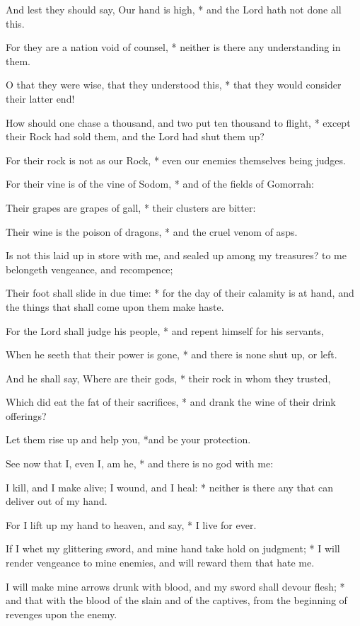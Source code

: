 \begin{multicols}{2}
And lest they should say, Our hand is high, * and the Lord hath not done all this.\par
For they are a nation void of counsel, * neither is there any understanding in them.\par
O that they were wise, that they understood this, * that they would consider their latter end!\par
How should one chase a thousand, {\dag} and two put ten thousand to flight, * except their Rock had sold them, and the Lord had shut them up?\par
For their rock is not as our Rock, * even our enemies themselves being judges.\par
For their vine is of the vine of Sodom, * and of the fields of Gomorrah:\par
Their grapes are grapes of gall, * their clusters are bitter:\par
Their wine is the poison of dragons, * and the cruel venom of asps.\par
Is not this laid up in store with me, {\dag} and sealed up among my treasures? to me belongeth vengeance, and recompence;\par
Their foot shall slide in due time: * for the day of their calamity is at hand, and the things that shall come upon them make haste.\par
For the Lord shall judge his people, * and repent himself for his servants,\par
When he seeth that their power is gone, * and there is none shut up, or left.\par
And he shall say, Where are their gods, * their rock in whom they trusted,\par
Which did eat the fat of their sacrifices, * and drank the wine of their drink offerings?\par
Let them rise up and help you, *and be your protection.\par
See now that I, even I, am he, * and there is no god with me:\par
I kill, and I make alive; {\dag} I wound, and I heal: * neither is there any that can deliver out of my hand.\par
For I lift up my hand to heaven, and say, * I live for ever.\par
If I whet my glittering sword, and mine hand take hold on judgment; * I will render vengeance to mine enemies, and will reward them that hate me.\par
I will make mine arrows drunk with blood, {\dag} and my sword shall devour flesh; * and that with the blood of the slain and of the captives, from the beginning of revenges upon the enemy.\par

\end{multicols}
